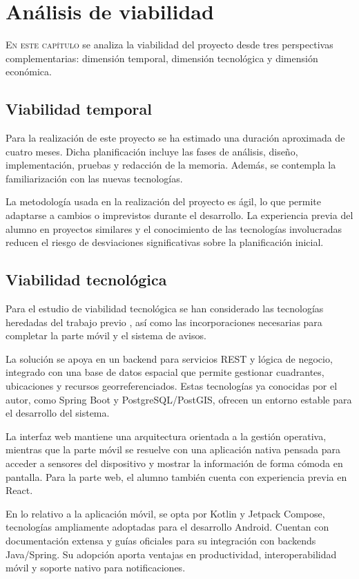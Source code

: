 \chapter{Análisis de viabilidad}
\label{chap:viabilidade}

\lettrine{E}{n este capítulo} se analiza la viabilidad del proyecto desde tres perspectivas complementarias: dimensión temporal, dimensión tecnológica y dimensión económica.

\section{Viabilidad temporal}
Para la realización de este proyecto se ha estimado una duración aproximada de cuatro meses. Dicha planificación incluye las fases de análisis, diseño, implementación, pruebas y redacción de la memoria. Además, se contempla la familiarización con las nuevas tecnologías.

La metodología usada en la realización del proyecto es ágil, lo que permite adaptarse a cambios o imprevistos durante el desarrollo. La experiencia previa del alumno en proyectos similares y el conocimiento de las tecnologías involucradas reducen el riesgo de desviaciones significativas sobre la planificación inicial.

\section{Viabilidad tecnológica}
Para el estudio de viabilidad tecnológica se han considerado las tecnologías heredadas del trabajo previo \cite{TFGAdrianGarcia2025}, así como las incorporaciones necesarias para completar la parte móvil y el sistema de avisos.

La solución se apoya en un backend para servicios REST y lógica de negocio, integrado con una base de datos espacial que permite gestionar cuadrantes, ubicaciones y recursos georreferenciados. Estas tecnologías ya conocidas por el autor, como Spring Boot y PostgreSQL/PostGIS, ofrecen un entorno estable para el desarrollo del sistema.

La interfaz web mantiene una arquitectura orientada a la gestión operativa, mientras que la parte móvil se resuelve con una aplicación nativa pensada para acceder a sensores del dispositivo y mostrar la información de forma cómoda en pantalla. Para la parte web, el alumno también cuenta con experiencia previa en React.

En lo relativo a la aplicación móvil, se opta por Kotlin y Jetpack Compose, tecnologías ampliamente adoptadas para el desarrollo Android. Cuentan con documentación extensa y guías oficiales para su integración con backends Java/Spring. Su adopción aporta ventajas en productividad, interoperabilidad móvil y soporte nativo para notificaciones.

